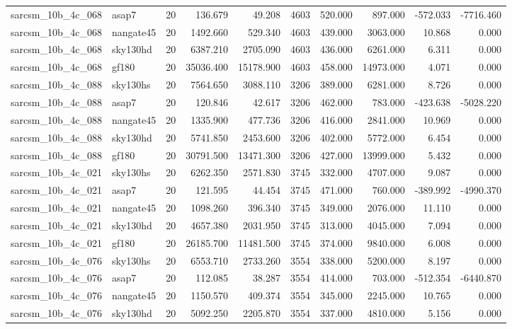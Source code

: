 \begin{longtable}{llrrrrrrrr}
sarcsm\_10b\_4c\_068 & asap7 & 20 & 136.679 & 49.208 & 4603 & 520.000 & 897.000 & -572.033 & -7716.460 \\
sarcsm\_10b\_4c\_068 & nangate45 & 20 & 1492.660 & 529.340 & 4603 & 439.000 & 3063.000 & 10.868 & 0.000 \\
sarcsm\_10b\_4c\_068 & sky130hd & 20 & 6387.210 & 2705.090 & 4603 & 436.000 & 6261.000 & 6.311 & 0.000 \\
sarcsm\_10b\_4c\_068 & gf180 & 20 & 35036.400 & 15178.900 & 4603 & 458.000 & 14973.000 & 4.071 & 0.000 \\
sarcsm\_10b\_4c\_088 & sky130hs & 20 & 7564.650 & 3088.110 & 3206 & 389.000 & 6281.000 & 8.726 & 0.000 \\
sarcsm\_10b\_4c\_088 & asap7 & 20 & 120.846 & 42.617 & 3206 & 462.000 & 783.000 & -423.638 & -5028.220 \\
sarcsm\_10b\_4c\_088 & nangate45 & 20 & 1335.900 & 477.736 & 3206 & 416.000 & 2841.000 & 10.969 & 0.000 \\
sarcsm\_10b\_4c\_088 & sky130hd & 20 & 5741.850 & 2453.600 & 3206 & 402.000 & 5772.000 & 6.454 & 0.000 \\
sarcsm\_10b\_4c\_088 & gf180 & 20 & 30791.500 & 13471.300 & 3206 & 427.000 & 13999.000 & 5.432 & 0.000 \\
sarcsm\_10b\_4c\_021 & sky130hs & 20 & 6262.350 & 2571.830 & 3745 & 332.000 & 4707.000 & 9.087 & 0.000 \\
sarcsm\_10b\_4c\_021 & asap7 & 20 & 121.595 & 44.454 & 3745 & 471.000 & 760.000 & -389.992 & -4990.370 \\
sarcsm\_10b\_4c\_021 & nangate45 & 20 & 1098.260 & 396.340 & 3745 & 349.000 & 2076.000 & 11.110 & 0.000 \\
sarcsm\_10b\_4c\_021 & sky130hd & 20 & 4657.380 & 2031.950 & 3745 & 313.000 & 4045.000 & 7.094 & 0.000 \\
sarcsm\_10b\_4c\_021 & gf180 & 20 & 26185.700 & 11481.500 & 3745 & 374.000 & 9840.000 & 6.008 & 0.000 \\
sarcsm\_10b\_4c\_076 & sky130hs & 20 & 6553.710 & 2733.260 & 3554 & 338.000 & 5200.000 & 8.197 & 0.000 \\
sarcsm\_10b\_4c\_076 & asap7 & 20 & 112.085 & 38.287 & 3554 & 414.000 & 703.000 & -512.354 & -6440.870 \\
sarcsm\_10b\_4c\_076 & nangate45 & 20 & 1150.570 & 409.374 & 3554 & 345.000 & 2245.000 & 10.765 & 0.000 \\
sarcsm\_10b\_4c\_076 & sky130hd & 20 & 5092.250 & 2205.870 & 3554 & 337.000 & 4810.000 & 5.156 & 0.000 \\

\end{longtable}
